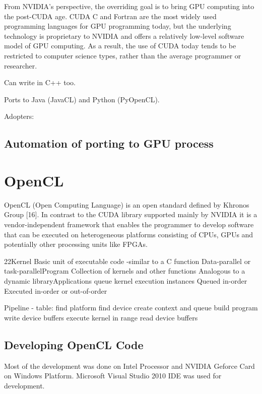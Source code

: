 From NVIDIA's perspective, the overriding goal is to bring GPU computing into the post-CUDA age.  CUDA C and Fortran are the most widely used programming languages for GPU programming today, but the underlying technology is proprietary to NVIDIA and offers a relatively low-level software model of GPU computing. As a result, the use of CUDA today tends to be restricted to computer science types, rather than the average programmer or researcher.


Can write in C++ too.

Ports to Java (JavaCL) and Python (PyOpenCL).


Adopters: %

\subsection{Automation of porting to GPU process}



\section{OpenCL}

OpenCL (Open Computing Language) is an open
standard defined by Khronos Group [16]. In contrast
to the CUDA library supported mainly by NVIDIA
it is a vendor-independent framework that enables
the programmer to develop software that can be executed
on heterogeneous platforms consisting of CPUs,
GPUs and potentially other processing units like FPGAs.

22Kernel
Basic unit of executable code -similar to a C function
Data-parallel or task-parallelProgram
Collection of kernels and other functions
Analogous to a dynamic libraryApplications queue kernel execution instances
Queued in-order
Executed in-order or out-of-order

Pipeline - table:
find platform
find device
create context and queue
build program
write device buffers
execute kernel in range
read device buffers

\subsection{Developing OpenCL Code}
Most of the development was done on Intel Processor and NVIDIA Geforce Card on Windows Platform. Microsoft Visual Studio 2010 IDE was used for development.

